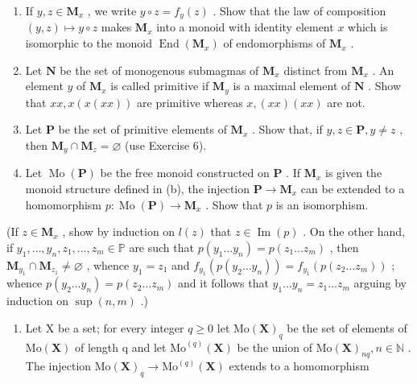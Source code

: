 \begin{enumerate}
\def\labelenumi{(\alph{enumi})}
\setcounter{enumi}{1}
\item
  If \(y, z \in \mathbf{M}_x\) , we write \(y \circ z = f_y(z)\) . Show that the law of composition \((y, z) \mapsto y \circ z\) makes \(\mathbf{M}_x\) into a monoid with identity element \(x\) which is isomorphic to the monoid \(\operatorname{End}(\mathbf{M}_x)\) of endomorphisms of \(\mathbf{M}_x\) .
\item
  Let \(\mathbf{N}\) be the set of monogenous submagmas of \(\mathbf{M}_x\) distinct from \(\mathbf{M}_x\) . An element \(y\) of \(\mathbf{M}_x\) is called primitive if \(\mathbf{M}_y\) is a maximal element of \(\mathbf{N}\) . Show that \(xx, x(x(xx))\) are primitive whereas \(x, (xx)(xx)\) are not.
\item
  Let \(\mathbf{P}\) be the set of primitive elements of \(\mathbf{M}_x\) . Show that, if \(y, z \in \mathbf{P}, y \neq z\) , then \(\mathbf{M}_y \cap \mathbf{M}_z = \varnothing\) (use Exercise 6).
\item
  Let \(\operatorname{Mo}(\mathbf{P})\) be the free monoid constructed on \(\mathbf{P}\) . If \(\mathbf{M}_x\) is given the monoid structure defined in (b), the injection \(\mathbf{P} \to \mathbf{M}_x\) can be extended to a homomorphism \(p: \operatorname{Mo}(\mathbf{P}) \to \mathbf{M}_x\) . Show that \(p\) is an isomorphism.
\end{enumerate}

(If \(z \in \mathbf{M}_x\) , show by induction on \(l(z)\) that \(z \in \operatorname{Im}(p)\) . On the other hand, if \(y_1, \ldots, y_n, z_1, \ldots, z_m \in \mathbb{P}\) are such that \(p(y_1 \ldots y_n) = p(z_1 \ldots z_m)\) , then \(\mathbf{M}_{y_1} \cap \mathbf{M}_{z_1} \neq \varnothing\) , whence \(y_1 = z_1\) and \(f_{y_1}(p(y_2 \ldots y_n)) = f_{y_1}(p(z_2 \ldots z_m))\) ; whence \(p(y_2 \ldots y_n) = p(z_2 \ldots z_m)\) and it follows that \(y_1 \ldots y_n = z_1 \ldots z_m\) arguing by induction on \(\sup(n, m)\) .)

\begin{enumerate}
\def\labelenumi{\arabic{enumi}.}
\setcounter{enumi}{7}
\tightlist
\item
  Let X be a set; for every integer \(q \geqslant 0\) let \(\mathrm{Mo}(\mathbf{X})_{q}\) be the set of elements of \(\mathrm{Mo}(\mathbf{X})\) of length q and let \(\mathrm{Mo}^{(q)}(\mathbf{X})\) be the union of \(\mathrm{Mo}(\mathbf{X})_{nq}, n \in \mathbb{N}\) . The injection \(\mathrm{Mo}(\mathbf{X})_{q} \to \mathrm{Mo}^{(q)}(\mathbf{X})\) extends to a homomorphism
\end{enumerate}

